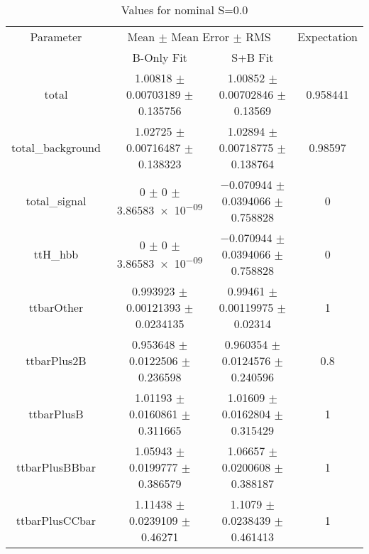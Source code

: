 \begin{table}
\centering
\caption{Values for nominal S=0.0}
\begin{tabular}{cccc}
\toprule
Parameter & \multicolumn{2}{c}{Mean $\pm$ Mean Error $\pm$ RMS} & Expectation\\
 & B-Only Fit & S+B Fit & \\
\midrule
total & \num{1.00818} $\pm$ \num{0.00703189} $\pm$ \num{0.135756} & \num{1.00852} $\pm$ \num{0.00702846} $\pm$ \num{0.13569} & \num{0.958441}\\
total\_background & \num{1.02725} $\pm$ \num{0.00716487} $\pm$ \num{0.138323} & \num{1.02894} $\pm$ \num{0.00718775} $\pm$ \num{0.138764} & \num{0.98597}\\
total\_signal & \num{0} $\pm$ \num{0} $\pm$ \num{3.86583e-09} & \num{-0.070944} $\pm$ \num{0.0394066} $\pm$ \num{0.758828} & \num{0}\\
ttH\_hbb & \num{0} $\pm$ \num{0} $\pm$ \num{3.86583e-09} & \num{-0.070944} $\pm$ \num{0.0394066} $\pm$ \num{0.758828} & \num{0}\\
ttbarOther & \num{0.993923} $\pm$ \num{0.00121393} $\pm$ \num{0.0234135} & \num{0.99461} $\pm$ \num{0.00119975} $\pm$ \num{0.02314} & \num{1}\\
ttbarPlus2B & \num{0.953648} $\pm$ \num{0.0122506} $\pm$ \num{0.236598} & \num{0.960354} $\pm$ \num{0.0124576} $\pm$ \num{0.240596} & \num{0.8}\\
ttbarPlusB & \num{1.01193} $\pm$ \num{0.0160861} $\pm$ \num{0.311665} & \num{1.01609} $\pm$ \num{0.0162804} $\pm$ \num{0.315429} & \num{1}\\
ttbarPlusBBbar & \num{1.05943} $\pm$ \num{0.0199777} $\pm$ \num{0.386579} & \num{1.06657} $\pm$ \num{0.0200608} $\pm$ \num{0.388187} & \num{1}\\
ttbarPlusCCbar & \num{1.11438} $\pm$ \num{0.0239109} $\pm$ \num{0.46271} & \num{1.1079} $\pm$ \num{0.0238439} $\pm$ \num{0.461413} & \num{1}\\
\bottomrule
\end{tabular}
\end{table}